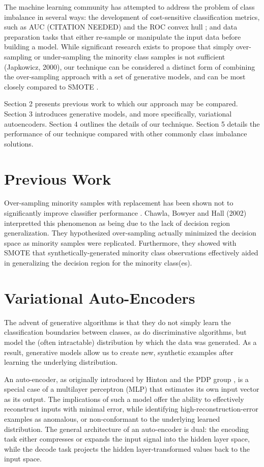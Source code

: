 \documentclass[twoside,11pt]{article}
\begin{document}
The machine learning community has attempted to address the problem of class imbalance in several ways: the development of cost-sensitive classification metrics, such as AUC (CITATION NEEDED) and the ROC convex hull \citep{provost2001robust}; and data preparation tasks that either re-sample or manipulate the input data before building a model. While significant research exists to propose that simply over-sampling or under-sampling the minority class samples is not sufficient (Japkowicz, 2000), our technique can be considered a distinct form of combining the over-sampling approach with a set of generative models, and can be most closely compared to SMOTE \citep{chawla2002smote}.

Section 2 presents previous work to which our approach may be compared. Section 3 introduces generative models, and more specifically, variational autoencoders. Section 4 outlines the details of our technique. Section 5 details the performance of our technique compared with other commonly class imbalance solutions. \\

\section{Previous Work}

Over-sampling minority samples with replacement has been shown not to significantly improve classifier performance \citep{japkowicz2000learning}.  Chawla, Bowyer and Hall (2002) interpretted this phenomenon as being due to the lack of decision region generalization. They hypothesized over-sampling actually minimized the decision space as minority samples were replicated. Furthermore, they showed with SMOTE that synthetically-generated minority class observations effectively aided in generalizing the decision region for the minority class(es).

\section{Variational Auto-Encoders}

The advent of generative algorithms is that they do not simply learn the classification boundaries between classes, as do discriminative algorithms, but model the (often intractable) distribution by which the data was generated. As a result, generative models allow us to create new, synthetic examples after learning the underlying distribution. 

An auto-encoder, as originally introduced by Hinton and the PDP group \citep{rumelhart1985learning}, is a special case of a multilayer perceptron (MLP) that estimates its own input vector as its output. The implications of such a model offer the ability to effectively reconstruct inputs with minimal error, while identifying high-reconstruction-error examples as anomalous, or non-conformant to the underlying learned distribution. The general architecture of an auto-encoder is dual: the encoding task either compresses or expands the input signal into the hidden layer space, while the decode task projects the hidden layer-transformed values back to the input space.
\end{document}
